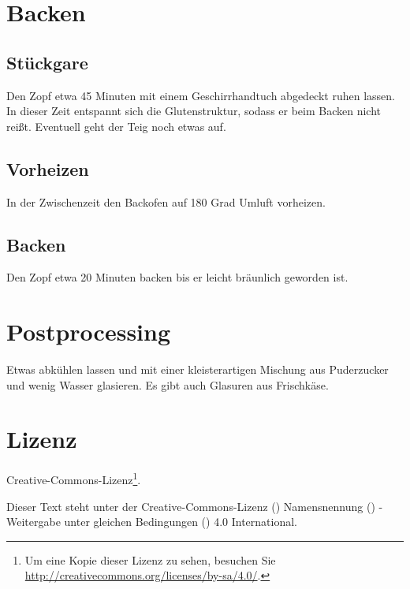 \documentclass[a4paper, oneside]{recipe}
\begin{document}
\section*{Backen}
\subsection*{Stückgare}
Den Zopf etwa 45 Minuten mit einem Geschirrhandtuch abgedeckt ruhen lassen. In dieser Zeit entspannt sich die Glutenstruktur, sodass er beim Backen nicht reißt. Eventuell geht der Teig noch etwas auf.

\subsection*{Vorheizen}
In der Zwischenzeit den Backofen auf 180 Grad Umluft vorheizen.

\subsection*{Backen}
Den Zopf etwa 20 Minuten backen bis er leicht bräunlich geworden ist.

\section*{Postprocessing}
Etwas abkühlen lassen und mit einer kleisterartigen Mischung aus Puderzucker und wenig Wasser glasieren. Es gibt auch Glasuren aus Frischkäse.

\section*{Lizenz}
\ccbysa{} Creative-Commons-Lizenz\footnote{Um eine Kopie dieser Lizenz zu sehen, besuchen Sie \url{http://creativecommons.org/licenses/by-sa/4.0/}.}.

Dieser Text steht unter der Creative-Commons-Lizenz (\ccLogo) Namensnennung (\ccAttribution) - Weitergabe unter gleichen Bedingungen (\ccShareAlike) 4.0 International. 
\end{document}
